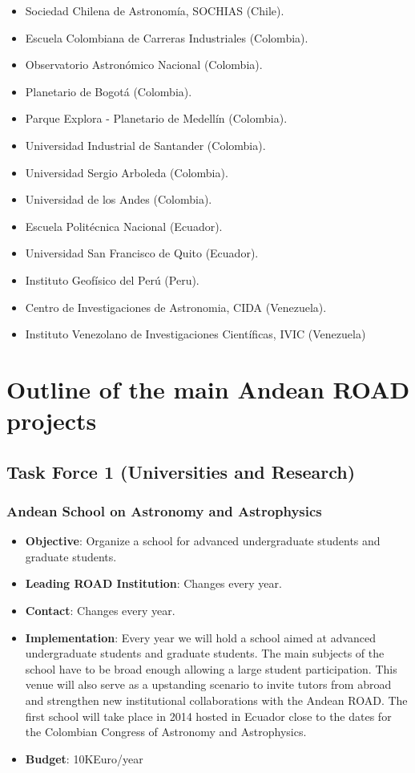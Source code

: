 \documentclass[12pt]{article}
\begin{document}
\begin{itemize}
\item {Sociedad Chilena de Astronom\'ia, SOCHIAS (Chile).}
\item {Escuela Colombiana de Carreras Industriales (Colombia).}
\item {Observatorio Astron\'omico Nacional (Colombia).}
\item {Planetario de Bogot\'a (Colombia).}
\item {Parque Explora - Planetario de Medell\'in (Colombia).}
\item {Universidad Industrial de Santander (Colombia).}
\item {Universidad Sergio Arboleda (Colombia).}
\item {Universidad de los Andes (Colombia).}
\item {Escuela Polit\'ecnica Nacional (Ecuador).}
\item {Universidad San Francisco de Quito (Ecuador).}
\item {Instituto Geof\'isico del Per\'u (Peru).}
\item {Centro de Investigaciones de Astronomia, CIDA (Venezuela).}
\item {Instituto Venezolano de Investigaciones Cient\'ificas, IVIC (Venezuela)}
\end{itemize}




\section{Outline of the main Andean ROAD projects}

\subsection{Task Force 1 (Universities and Research)}

\subsubsection{Andean School on Astronomy and Astrophysics}

\begin{itemize}

\item{\bf Objective}: Organize a school for advanced undergraduate
  students and graduate students.
\item{\bf Leading ROAD Institution}: Changes every year.
\item{\bf Contact}: Changes every year.
\item{\bf Implementation}:
Every year we will hold a school aimed at
  advanced undergraduate students and graduate students. The main
  subjects of the school have to be broad enough allowing a large
  student participation. This venue will also serve as a upstanding
  scenario to invite tutors from abroad and strengthen new
  institutional collaborations with the Andean ROAD. The first school
  will take place in 2014 hosted in Ecuador close to the dates for the
  Colombian Congress of Astronomy and Astrophysics.  
\item{\bf Budget}: 10KEuro/year
\end{itemize}
\end{document}

